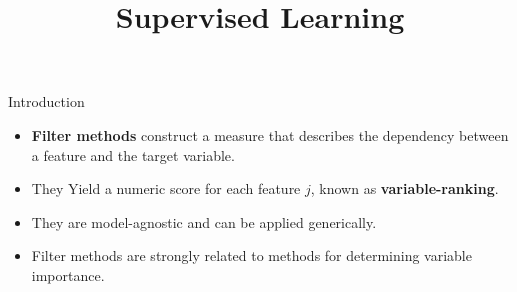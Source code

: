 \documentclass[11pt,compress,t,notes=noshow, xcolor=table]{beamer}
\title{Supervised Learning}
\date{}
\begin{document}

  \begin{vbframe}{Introduction}

  \begin{itemize}
    \item \textbf{Filter methods} construct a measure that describes the dependency between a feature and the target variable.
    \item They Yield a numeric score for each feature $j$, known as \textbf{variable-ranking}.
    \item They are model-agnostic and can be applied generically.
    \item Filter methods are strongly related to methods for determining variable importance.
  \end{itemize}
  \end{vbframe}









\end{document}
